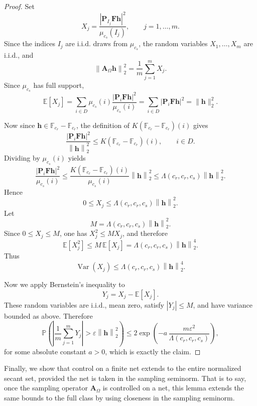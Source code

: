 \documentclass{article}
\theoremstyle{plain}
\theoremstyle{definition}
\theoremstyle{remark}
\begin{document}
\begin{proof}
  Set
  \[
    X_j
    =
    \frac{\left|\mathbf{P}_{I_j}\mathbf{F}\mathbf{h}\right|^2}{\mu_{c_s}\left(I_j\right)},
    \qquad
    j=1,\dots,m.
  \]
  Since the indices $I_j$ are i.i.d. draws from $\mu_{c_s}$, the random variables $X_1,\dots,X_m$ are i.i.d., and
  \[
    \left\|\mathbf{A}_\Omega\mathbf{h}\right\|_2^2
    =
    \frac{1}{m}\sum_{j=1}^m X_j.
  \]
Since $\mu_{c_s}$ has full support,
\[
  \mathbb E[X_j]
  =
  \sum_{i\in D}
  \mu_{c_s}(i)
  \frac{|\mathbf P_i\mathbf F\mathbf h|^2}{\mu_{c_s}(i)}
  =
  \sum_{i\in D}
  |\mathbf P_i\mathbf F\mathbf h|^2
  =
  \|\mathbf h\|_2^2.
\]

  Now since $\mathbf{h}\in\mathbb{F}_{c_r}-\mathbb{F}_{c_r}$, the definition of $K(\mathbb{F}_{c_r}-\mathbb{F}_{c_r})(i)$ gives
  \[
    \frac{\left|\mathbf{P}_i\mathbf{F}\mathbf{h}\right|^2}{\left\|\mathbf{h}\right\|_2^2}
    \leq
    K(\mathbb{F}_{c_r}-\mathbb{F}_{c_r})(i),
    \qquad
    i\in D.
  \]
  Dividing by $\mu_{c_s}\left(i\right)$ yields
  \[
    \frac{\left|\mathbf{P}_i\mathbf{F}\mathbf{h}\right|^2}{\mu_{c_s}\left(i\right)}
    \leq
    \frac{K(\mathbb{F}_{c_r}-\mathbb{F}_{c_r})(i)}{\mu_{c_s}\left(i\right)}
    \left\|\mathbf{h}\right\|_2^2
    \leq
    \Lambda\left(c_r,c_r,c_s\right)\left\|\mathbf{h}\right\|_2^2.
  \]
  Hence
  \[
    0\leq X_j\leq \Lambda\left(c_r,c_r,c_s\right)\left\|\mathbf{h}\right\|_2^2.
  \]
  Let
  \[
    M=\Lambda\left(c_r,c_r,c_s\right)\left\|\mathbf{h}\right\|_2^2.
  \]
  Since $0\leq X_j\leq M$, one has $X_j^2\leq M X_j$, and therefore
  \[
    \mathbb{E}\left[X_j^2\right]
    \leq
    M\,\mathbb{E}\left[X_j\right]
    =
    \Lambda\left(c_r,c_r,c_s\right)\left\|\mathbf{h}\right\|_2^4.
  \]
  Thus
  \[
    \operatorname{Var}\left(X_j\right)
    \leq
    \Lambda\left(c_r,c_r,c_s\right)\left\|\mathbf{h}\right\|_2^4.
  \]

  Now we apply Bernstein's inequality to
  \[
    Y_j=X_j-\mathbb{E}\left[X_j\right].
  \]
  These random variables are i.i.d., mean zero, satisfy $\left|Y_j\right|\leq M$, and have variance bounded as above. Therefore
  \[
    \mathbb{P}\left(
      \left|
      \frac{1}{m}\sum_{j=1}^m Y_j
      \right|
      >
      \varepsilon\left\|\mathbf{h}\right\|_2^2
    \right)
    \leq
    2\exp\left(-a\,\frac{m\varepsilon^2}{\Lambda\left(c_r,c_r,c_s\right)}\right),
  \]
  for some absolute constant $a > 0$, which is exactly the claim.
\end{proof}

Finally, we show that control on a finite net extends to the entire normalized secant set, provided the net is taken in the sampling seminorm. That is to say, once the sampling operator $\mathbf A_\Omega$ is controlled on a net, this lemma extends the same bounds to the full class by using closeness in the sampling seminorm.
\end{document}
